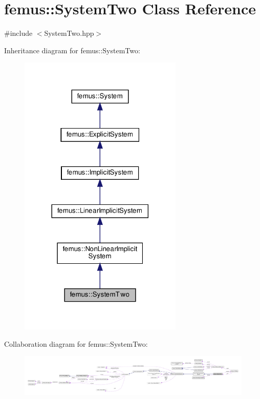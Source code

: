 \hypertarget{classfemus_1_1_system_two}{}\section{femus\+:\+:System\+Two Class Reference}
\label{classfemus_1_1_system_two}


{\ttfamily \#include $<$System\+Two.\+hpp$>$}



Inheritance diagram for femus\+:\+:System\+Two\+:
\nopagebreak
\begin{figure}[H]
\begin{center}
\leavevmode
\includegraphics[width=221pt]{classfemus_1_1_system_two__inherit__graph}
\end{center}
\end{figure}


Collaboration diagram for femus\+:\+:System\+Two\+:
\nopagebreak
\begin{figure}[H]
\begin{center}
\leavevmode
\includegraphics[width=350pt]{classfemus_1_1_system_two__coll__graph}
\end{center}
\end{figure}
